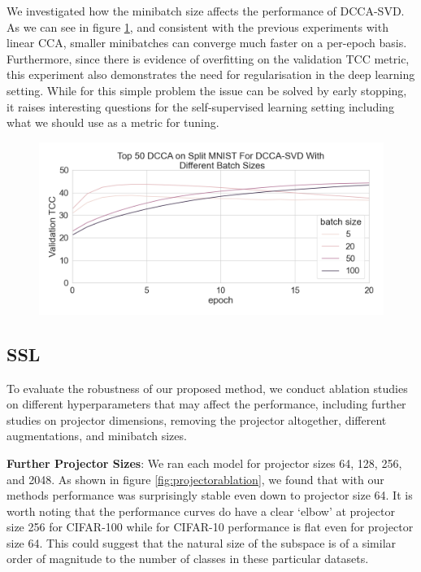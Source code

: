 We investigated how the minibatch size affects the performance of DCCA-SVD. As we can see in figure \ref{fig:deep minibatch size ablation}, and consistent with the previous experiments with linear CCA, smaller minibatches can converge much faster on a per-epoch basis. Furthermore, since there is evidence of overfitting on the validation TCC metric, this experiment also demonstrates the need for regularisation in the deep learning setting.  While for this simple problem the issue can be solved by early stopping, it raises interesting questions for the self-supervised learning setting including what we should use as a metric for tuning.

\begin{figure}[h]
\centering
\includegraphics[width=\textwidth]{figures/deep_learning/DCCA/deep_SplitMNIST_minibatch_size_ablation.png}
\caption{}
\label{fig:deep minibatch size ablation}
\end{figure}


\subsection{SSL}
To evaluate the robustness of our proposed method, we conduct ablation studies on different hyperparameters that may affect the performance, including further studies on projector dimensions, removing the projector altogether, different augmentations, and minibatch sizes.

\textbf{Further Projector Sizes}: We ran each model for projector sizes 64, 128, 256, and 2048. As shown in figure \ref{fig:projectorablation}, we found that with our methods performance was surprisingly stable even down to projector size 64. It is worth noting that the performance curves do have a clear `elbow' at projector size 256 for CIFAR-100 while for CIFAR-10 performance is flat even for projector size 64. This could suggest that the natural size of the subspace is of a similar order of magnitude to the number of classes in these particular datasets. 

